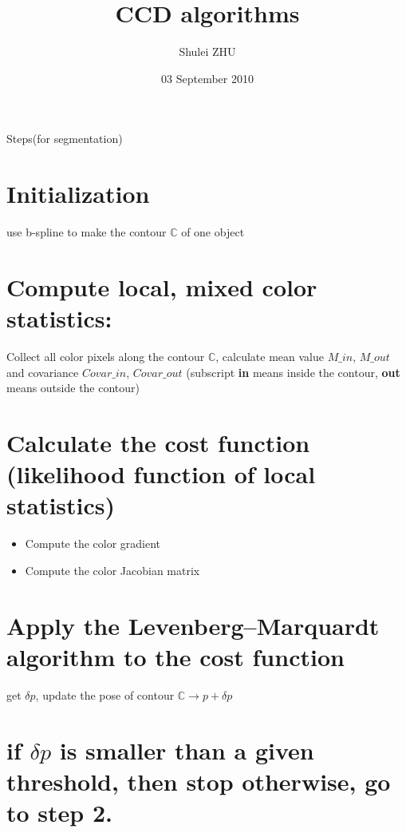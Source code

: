 \documentclass[11pt]{article}
\title{CCD algorithms}
\author{Shulei ZHU}
\date{03 September 2010}
\begin{document}
\maketitle


 Steps(for segmentation)

\section{Initialization}
\label{sec-1}

   use b-spline to make the contour $\mathbb{C}$ of one object
\section{Compute local, mixed color statistics:}
\label{sec-2}


Collect all color pixels along the contour $\mathbb{C}$, calculate mean value $M\_in$, $M\_out$ and  covariance $Covar\_in$,
$Covar\_out$ (subscript \textbf{in} means inside the contour, \textbf{out} means
outside the contour)
\section{Calculate the cost function (likelihood function of local statistics)}
\label{sec-3}

\begin{itemize}
\item Compute the color gradient
\item Compute the color Jacobian matrix
\end{itemize}
\section{Apply the Levenberg–Marquardt algorithm to the cost function}
\label{sec-4}

   get $\delta p$, update the pose of contour $\mathbb{C} \rightarrow
   p+\delta p$ 
\section{if $\delta p$ is smaller than a given threshold, then stop otherwise, go to step 2.}
\label{sec-5}
\end{document}
